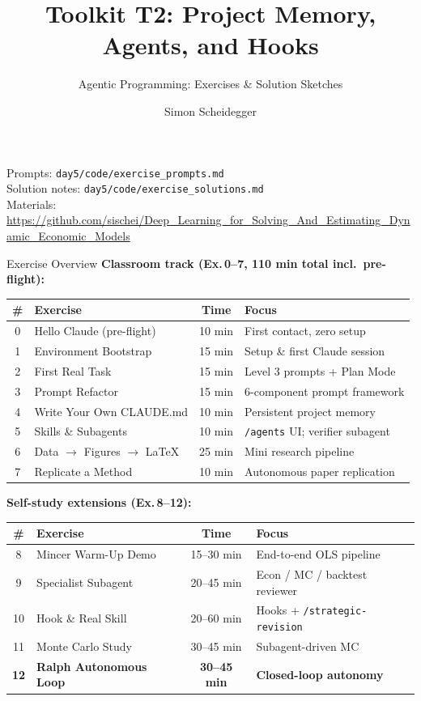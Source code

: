 \documentclass[aspectratio=169,10pt]{beamer}
\title[Toolkit T2]{Toolkit T2: Project Memory, Agents, and Hooks}
\subtitle{Agentic Programming: Exercises \& Solution Sketches}
\author{Simon Scheidegger}
\institute{HEC, University of Lausanne}
\date{}
\newcommand{\emphc}[1]{\textcolor{harvardcrimson}{#1}}
\begin{document}
{
\begin{frame}
\titlepage
\begin{center}
{\footnotesize Prompts: \texttt{day5/code/exercise\_prompts.md}\\
Solution notes: \texttt{day5/code/exercise\_solutions.md}\\[2pt]
Materials: \url{https://github.com/sischei/Deep_Learning_for_Solving_And_Estimating_Dynamic_Economic_Models}}
\end{center}
\end{frame}}

\begin{frame}{Exercise Overview}
\scriptsize
\textbf{Classroom track (Ex.\,0--7, 110 min total incl.\ pre-flight):}
\renewcommand{\arraystretch}{1.05}
\begin{center}
\begin{tabular}{c l c l}
\toprule
\textbf{\#} & \textbf{Exercise} & \textbf{Time} & \textbf{Focus} \\
\midrule
0 & Hello Claude (\emphc{pre-flight}) & 10 min & First contact, zero setup \\
1 & Environment Bootstrap & 15 min & Setup \& first Claude session \\
2 & First Real Task & 15 min & Level 3 prompts + Plan Mode \\
3 & Prompt Refactor & 15 min & 6-component prompt framework \\
4 & Write Your Own CLAUDE.md & 10 min & Persistent project memory \\
5 & Skills \& Subagents & 10 min & \texttt{/agents} UI; verifier subagent \\
6 & Data $\to$ Figures $\to$ LaTeX & 25 min & Mini research pipeline \\
7 & Replicate a Method & 10 min & Autonomous paper replication \\
\bottomrule
\end{tabular}
\end{center}

\vspace{0.4em}
\textbf{Self-study extensions (Ex.\,8--12):}
\begin{center}
\begin{tabular}{c l c l}
\toprule
\textbf{\#} & \textbf{Exercise} & \textbf{Time} & \textbf{Focus} \\
\midrule
8  & Mincer Warm-Up Demo & 15--30 min & End-to-end OLS pipeline \\
9  & Specialist Subagent & 20--45 min & Econ / MC / backtest reviewer \\
10 & Hook \& Real Skill & 20--60 min & Hooks + \texttt{/strategic-revision} \\
11 & Monte Carlo Study & 30--45 min & Subagent-driven MC \\
\textbf{12} & \textbf{Ralph Autonomous Loop} & \textbf{30--45 min} & \textbf{Closed-loop autonomy} \\
\bottomrule
\end{tabular}
\end{center}


\end{frame}
\end{document}
